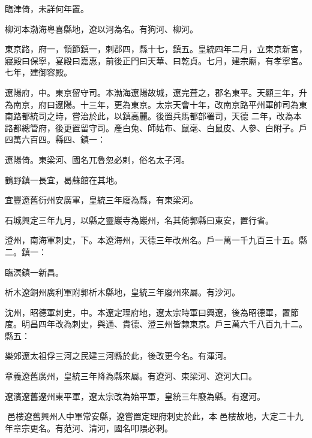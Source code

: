 \begin{pinyinscope}
 臨津倚，未詳何年置。



 柳河本渤海粵喜縣地，遼以河為名。有狗河、柳河。



 東京路，府一，領節鎮一，刺郡四，縣十七，鎮五。皇統四年二月，立東京新宮，寢殿曰保寧，宴殿曰嘉惠，前後正門曰天華、曰乾貞。七月，建宗廟，有孝寧宮。七年，建御容殿。



 遼陽府，中。東京留守司。本渤海遼陽故城，遼完葺之，郡名東平。天顯三年，升為南京，府曰遼陽。十三年，更為東京。太宗天會十年，改南京路平州軍帥司為東南路都統司之時，嘗治於此，以鎮高麗。後置兵馬都部署司，天德
 二年，改為本路都總管府，後更置留守司。產白兔、師姑布、鼠毫、白鼠皮、人參、白附子。戶四萬六百四。縣四、鎮一：



 遼陽倚。東梁河、國名兀魯忽必剌，俗名太子河。



 鶴野鎮一長宜，曷蘇館在其地。



 宜豐遼舊衍州安廣軍，皇統三年廢為縣，有東梁河。



 石城興定三年九月，以縣之靈巖寺為巖州，名其倚郭縣曰東安，置行省。



 澄州，南海軍刺史，下。本遼海州，天德三年改州名。戶一萬一千九百三十五。縣二。鎮一：



 臨溟鎮一新昌。



 析木遼銅州廣利軍附郭析木縣地，皇統三年廢州來屬。有沙河。



 沈州，昭德軍刺史，中。本遼定理府地，遼太宗時軍曰興遼，後為昭德軍，置節度。明昌四年改為刺史，與通、貴德、澄三州皆隸東京。戶三萬六千八百九十二。
 縣五：



 樂郊遼太祖俘三河之民建三河縣於此，後改更今名。有渾河。



 章義遼舊廣州，皇統三年降為縣來屬。有遼河、東梁河、遼河大口。



 遼濱遼舊遼州東平軍，遼太宗改為始平軍，皇統三年廢為縣。有遼河。



 邑樓遼舊興州人中軍常安縣，遼嘗置定理府刺史於此，本邑樓故地，大定二十九年章宗更名。有范河、清河，國名叩隈必剌。




\end{pinyinscope}
